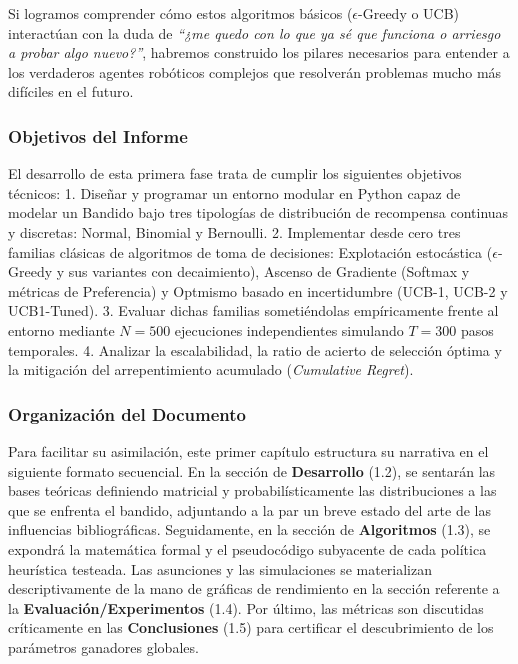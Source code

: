 Si logramos comprender cómo estos algoritmos básicos
(\(\epsilon\)-Greedy o UCB) interactúan con la duda de \emph{``¿me quedo
con lo que ya sé que funciona o arriesgo a probar algo nuevo?''},
habremos construido los pilares necesarios para entender a los
verdaderos agentes robóticos complejos que resolverán problemas mucho
más difíciles en el futuro.

\subsubsection{Objetivos del Informe}\label{objetivos-del-informe}

El desarrollo de esta primera fase trata de cumplir los siguientes
objetivos técnicos: 1. Diseñar y programar un entorno modular en Python
capaz de modelar un Bandido bajo tres tipologías de distribución de
recompensa continuas y discretas: Normal, Binomial y Bernoulli. 2.
Implementar desde cero tres familias clásicas de algoritmos de toma de
decisiones: Explotación estocástica (\(\epsilon\)-Greedy y sus variantes
con decaimiento), Ascenso de Gradiente (Softmax y métricas de
Preferencia) y Optmismo basado en incertidumbre (UCB-1, UCB-2 y
UCB1-Tuned). 3. Evaluar dichas familias sometiéndolas empíricamente
frente al entorno mediante \(N=500\) ejecuciones independientes
simulando \(T=300\) pasos temporales. 4. Analizar la escalabilidad, la
ratio de acierto de selección óptima y la mitigación del arrepentimiento
acumulado (\emph{Cumulative Regret}).

\subsubsection{Organización del
Documento}\label{organizaciuxf3n-del-documento}

Para facilitar su asimilación, este primer capítulo estructura su
narrativa en el siguiente formato secuencial. En la sección de
\textbf{Desarrollo} (1.2), se sentarán las bases teóricas definiendo
matricial y probabilísticamente las distribuciones a las que se enfrenta
el bandido, adjuntando a la par un breve estado del arte de las
influencias bibliográficas. Seguidamente, en la sección de
\textbf{Algoritmos} (1.3), se expondrá la matemática formal y el
pseudocódigo subyacente de cada política heurística testeada. Las
asunciones y las simulaciones se materializan descriptivamente de la
mano de gráficas de rendimiento en la sección referente a la
\textbf{Evaluación/Experimentos} (1.4). Por último, las métricas son
discutidas críticamente en las \textbf{Conclusiones} (1.5) para
certificar el descubrimiento de los parámetros ganadores globales.

